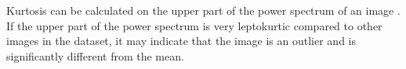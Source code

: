 Kurtosis can be calculated on the upper part of the power spectrum of an image \cite{Koho2016,Blokker2022}.
If the upper part of the power spectrum is very leptokurtic compared to other images in the dataset, it may indicate that the image is an outlier and is significantly different from the mean.
